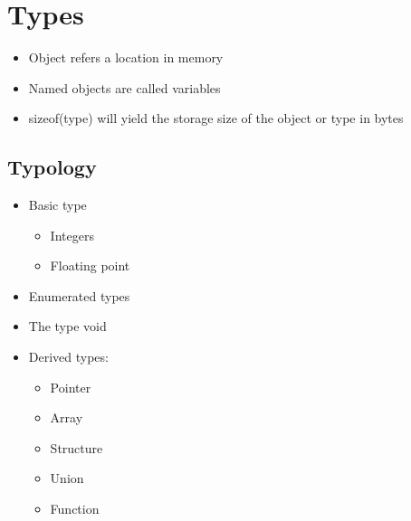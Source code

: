 \documentclass[a4wide,10pt]{article}
\begin{document}
	\newpage
	
	\section{Types} %
	\label{sec:types}
		\begin{itemize}
			\item Object refers a location in memory
			\item Named objects are called variables
			\item sizeof(type) will yield the storage size of the object or type in bytes
		\end{itemize}
		
		\subsection{Typology} %
		\label{sub:typology}
			\begin{itemize}
				\item Basic type
					\begin{itemize}
						\item Integers
						\item Floating point
					\end{itemize}
				\item Enumerated types
				\item The type void
				\item Derived types:
					\begin{itemize}
						\item Pointer
						\item Array
						\item Structure
						\item Union
						\item Function
					\end{itemize}
			\end{itemize}
		
\end{document}
